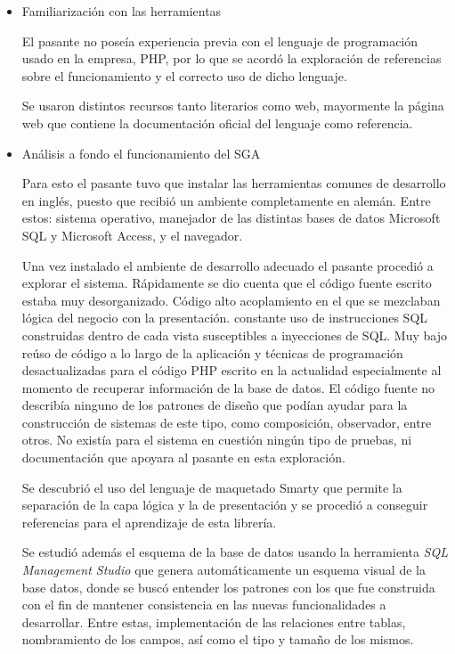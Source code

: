 \begin{itemize}
\item Familiarización con las herramientas

El pasante no poseía experiencia previa con el lenguaje de programación usado en la empresa, PHP, por lo que se acordó la exploración de referencias sobre el funcionamiento y el correcto uso de dicho lenguaje.

Se usaron distintos recursos tanto literarios como web, mayormente la página web que contiene la documentación oficial del lenguaje como referencia.

\item Análisis a fondo el funcionamiento del SGA

Para esto el pasante tuvo que instalar las herramientas comunes de desarrollo en inglés, puesto que recibió un ambiente completamente en alemán. Entre estos: sistema operativo, manejador de las distintas bases de datos Microsoft SQL y Microsoft Access, y el navegador.

Una vez instalado el ambiente de desarrollo adecuado el pasante procedió a explorar el sistema. Rápidamente se dio cuenta que el código fuente escrito estaba muy desorganizado. Código alto acoplamiento en el que se mezclaban lógica del negocio con la presentación. constante uso de instrucciones SQL construidas dentro de cada vista susceptibles a inyecciones de SQL. Muy bajo reúso de código a lo largo de la aplicación y técnicas de programación desactualizadas para el código PHP escrito en la actualidad especialmente al momento de recuperar información de la base de datos. El código fuente no describía ninguno de los patrones de diseño que podían ayudar para la construcción de sistemas de este tipo, como composición, observador, entre otros. No existía para el sistema en cuestión ningún tipo de pruebas, ni documentación que apoyara al pasante en esta exploración.

Se descubrió el uso del lenguaje de maquetado Smarty que permite la separación de la capa lógica y la de presentación y se procedió a conseguir referencias para el aprendizaje de esta librería.

Se estudió además el esquema de la base de datos usando la herramienta \emph{SQL Management Studio} que genera automáticamente un esquema visual de la base datos, donde se buscó entender los patrones con los que fue construida con el fin de mantener consistencia en las nuevas funcionalidades a desarrollar. Entre estas, implementación de las relaciones entre tablas, nombramiento de los campos, así como el tipo y tamaño de los mismos.


\end{itemize}
